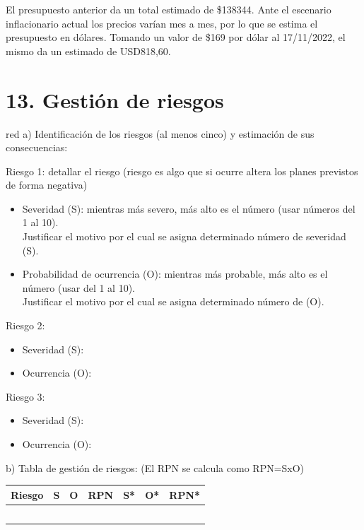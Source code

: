 \documentclass[
11pt, %
]{charter}
\begin{document}
El presupuesto anterior da un total estimado de \$138344. Ante el escenario inflacionario actual los precios varían mes a mes, por lo que se estima el presupuesto en dólares. Tomando un valor de \$169 por dólar al 17/11/2022, el mismo da un estimado de USD818,60.

\section{13. Gestión de riesgos}
\label{sec:riesgos}

\begin{consigna}{red}
a) Identificación de los riesgos (al menos cinco) y estimación de sus consecuencias:
 
Riesgo 1: detallar el riesgo (riesgo es algo que si ocurre altera los planes previstos de forma negativa)
\begin{itemize}
	\item Severidad (S): mientras más severo, más alto es el número (usar números del 1 al 10).\\
	Justificar el motivo por el cual se asigna determinado número de severidad (S).
	\item Probabilidad de ocurrencia (O): mientras más probable, más alto es el número (usar del 1 al 10).\\
	Justificar el motivo por el cual se asigna determinado número de (O). 
\end{itemize}   

Riesgo 2:
\begin{itemize}
	\item Severidad (S): 
	\item Ocurrencia (O):
\end{itemize}

Riesgo 3:
\begin{itemize}
	\item Severidad (S): 
	\item Ocurrencia (O):
\end{itemize}


b) Tabla de gestión de riesgos:      (El RPN se calcula como RPN=SxO)

\begin{table}[htpb]
\centering
\begin{tabularx}{\linewidth}{@{}|X|c|c|c|c|c|c|@{}}
\hline
\rowcolor[HTML]{C0C0C0} 
Riesgo & S & O & RPN & S* & O* & RPN* \\ \hline
       &   &   &     &    &    &      \\ \hline
       &   &   &     &    &    &      \\ \hline
       &   &   &     &    &    &      \\ \hline
       &   &   &     &    &    &      \\ \hline
       &   &   &     &    &    &      \\ \hline
\end{tabularx}%
\end{table}


\end{consigna}
\end{document}
